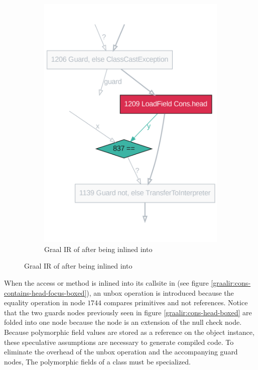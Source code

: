 \begin{figure}[!htb]
\begin{subfigure}[b]{0.4\textwidth}
		\includegraphics[width=\textwidth]{figures/dot/List.contains.specialized.TruffleTier.png}
		\caption{Graal IR of  after being inlined into }
		\label{graalir:cons-contains-head-focus-specialized}
	\end{subfigure}
	\hfill
\end{figure}

When the access or method  is inlined into its callsite in  (see figure \ref{graalir:cons-contains-head-focus-boxed}), an unbox operation is introduced because the equality operation in node $1744$ compares primitives and not references.
Notice that the two guards nodes previously seen in figure \ref{graalir:cons-head-boxed} are folded into one node because the  node is an extension of the null check node.
Because polymorphic field values are stored as a reference on the object instance, these speculative assumptions are necessary to generate compiled code.
To eliminate the overhead of the unbox operation and the accompanying guard nodes, The polymorphic fields of a class must be specialized.

